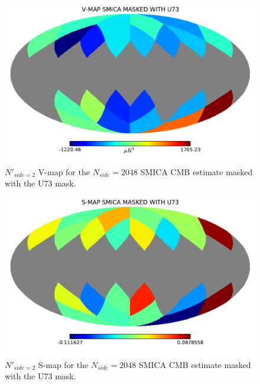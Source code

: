 \begin{figure}
\centering
\includegraphics[width=\textwidth]{figures/chapter-vsk/vmap-u73-smica.pdf}
\caption{$N'_{side = 2}$ V-map for the $N_{side} = 2048$ SMICA CMB estimate masked with the U73 mask.}
\label{Fig:3}
\end{figure}

\begin{figure}
\centering
\includegraphics[width=\textwidth]{figures/chapter-vsk/smap-u73-smica.pdf}
\caption{$N'_{side = 2}$ S-map for the $N_{side} = 2048$ SMICA CMB estimate masked with the U73 mask.}
\label{Fig:3a}
\end{figure}

